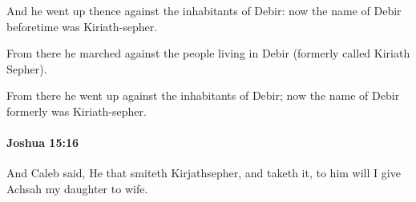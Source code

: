 			\begin{versebox}
					\item[BHS] 
					\item[ASV] And he went up thence against the inhabitants of Debir: now the name of Debir beforetime was Kiriath-sepher.
					\item[NIV] From there he marched against the people living in Debir (formerly called Kiriath Sepher).
					\item[NRSV] From there he went up against the inhabitants of Debir; now the name of Debir formerly was Kiriath-sepher.
			\end{versebox}

		\paragraph{Joshua 15:16} %
			\label{JOSHUA-15-16}

			And Caleb said, He that smiteth Kirjathsepher, and taketh it, to him will I give Achsah my daughter to wife.

